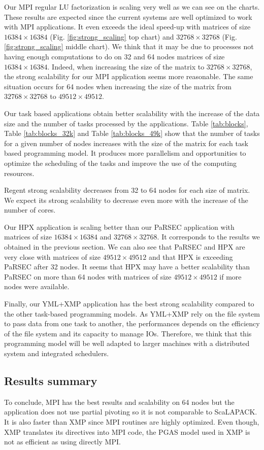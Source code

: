 Our MPI regular LU factorization is scaling very well as we can see on the charts.
These results are expected since the current systems are well optimized to work with MPI applications.
It even exceeds the ideal speed-up with matrices of size $16384 \times 16384$ (Fig. \ref{fig:strong_scaling} top chart) and $32768 \times 32768$ (Fig. \ref{fig:strong_scaling} middle chart).
We think that it may be due to processes not having enough computations to do on 32 and 64 nodes matrices of size $16384 \times 16384$.
Indeed, when increasing the size of the matrix to $32768 \times 32768$, the strong scalability for our MPI application seems more reasonable.
The same situation occurs for 64 nodes when increasing the size of the matrix from $32768 \times 32768$ to $49512 \times 49512$.

Our task based applications obtain better scalability with the increase of the data size and the number of tasks processed by the applications.
Table \ref{tab:blocks}, Table \ref{tab:blocks_32k} and Table \ref{tab:blocks_49k} show that the number of tasks for a given number of nodes increases with the size of the matrix for each task based programming model.
It produces more parallelism and opportunities to optimize the scheduling of the tasks and improve the use of the computing resources.

Regent strong scalability decreases from 32 to 64 nodes for each size of matrix.
We expect its strong scalability to decrease even more with the increase of the number of cores.

Our HPX application is scaling better than our PaRSEC application with matrices of size $16384 \times 16384$ and $32768 \times 32768$.
It corresponds to the results we obtained in the previous section.
We can also see that PaRSEC and HPX are very close with matrices of size $49512 \times 49512$ and that HPX is exceeding PaRSEC after 32 nodes.
It seems that HPX may have a better scalability than PaRSEC on more than 64 nodes with matrices of size $49512 \times 49512$ if more nodes were available.

Finally, our YML+XMP application has the best strong scalability compared to the other task-based programming models.
As YML+XMP rely on the file system to pass data from one task to another, the performances depends on the efficiency of the file system and its capacity to manage IOs.
Therefore, we think that this programming model will be well adapted to larger machines with a distributed system and integrated schedulers.

\subsection{Results summary}
To conclude, MPI has the best results and scalability on 64 nodes but the application does not use partial pivoting so it is not comparable to ScaLAPACK.
It is also faster than XMP since MPI routines are highly optimized.
Even though, XMP translates its directives into MPI code, the PGAS model used in XMP is not as efficient as using directly MPI.

